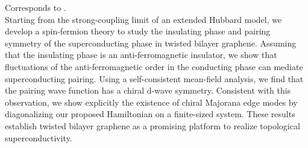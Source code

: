 Corresponds to \cite{2019Gu}.\\
 
 Starting from the strong-coupling limit of an extended Hubbard model, we develop a spin-fermion theory to study the insulating phase and pairing symmetry of the superconducting phase in twisted bilayer graphene. Assuming that the insulating phase is an anti-ferromagnetic insulator, we show that fluctuations of the anti-ferromagnetic order in the conducting phase can mediate superconducting pairing. Using a self-consistent mean-field analysis, we find that the pairing wave function has a chiral d-wave symmetry. Consistent with this observation, we show explicitly the existence of chiral Majorana edge modes by diagonalizing our proposed Hamiltonian on a finite-sized system. These results establish twisted bilayer graphene as a promising platform to realize topological superconductivity. 